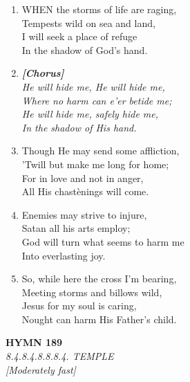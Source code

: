 \begin{enumerate}
    \item WHEN the storms of life are raging, \\
        Tempests wild on sea and land, \\
        I will seek a place of refuge \\
        In the shadow of God's hand.

    \item[] \vspace{0.4em}
    \textbf{\textit{[Chorus]}} \\
    \textit{He will hide me, He will hide me,} \\
    \textit{Where no harm can e'er betide me;} \\
    \textit{He will hide me, safely hide me,} \\
    \textit{In the shadow of His hand.}
    \vspace{0.4em}

    \item Though He may send some affliction, \\
        'Twill but make me long for home; \\
        For in love and not in anger, \\
        All His chast\`enings will come.

    \item Enemies may strive to injure, \\
        Satan all his arts employ; \\
        God will turn what seems to harm me \\
        Into everlasting joy.

    \item So, while here the cross I'm bearing, \\
        Meeting storms and billows wild, \\
        Jesus for my soul is caring, \\
        Nought can harm His Father's child.

\end{enumerate}

\newpage
\begin{center}
    {\Large \textbf{HYMN 189}}
    \\
    \textit{8.4.8.4.8.8.8.4. TEMPLE}
    \\
    \textit{\small [Moderately fast]}
\end{center}
\vspace{1em}

